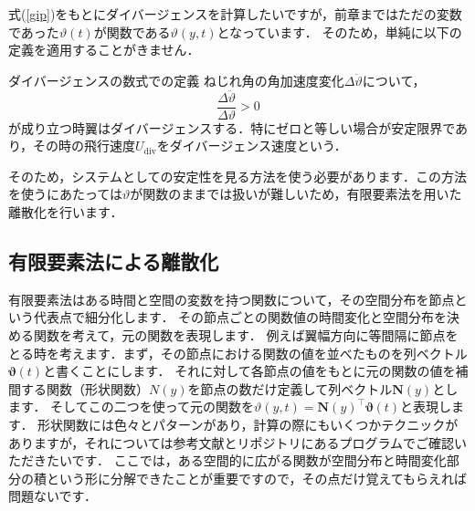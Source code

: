 \documentclass{jarticle}
\begin{document}
式(\ref{gip})をもとにダイバージェンスを計算したいですが，前章まではただの変数であった$\vartheta(t)$が関数である$\vartheta(y,t)$となっています．
そのため，単純に以下の定義を適用することがきません．
\begin{itembox}[l]{ダイバージェンスの数式での定義}
    ねじれ角の角加速度変化$\Delta \ddot{\vartheta}$について，
    \begin{equation*}
        \frac{\Delta \ddot{\vartheta}}{\Delta \vartheta} > 0
    \end{equation*}
    が成り立つ時翼はダイバージェンスする．特にゼロと等しい場合が安定限界であり，その時の飛行速度$U_\mathrm{div}$をダイバージェンス速度という．
\end{itembox}
そのため，システムとしての安定性を見る方法を使う必要があります．この方法を使うにあたっては$\vartheta$が関数のままでは扱いが難しいため，有限要素法を用いた離散化を行います．

\subsection{有限要素法による離散化}

有限要素法はある時間と空間の変数を持つ関数について，その空間分布を節点という代表点で細分化します．
その節点ごとの関数値の時間変化と空間分布を決める関数を考えて，元の関数を表現します．
例えば翼幅方向に等間隔に節点をとる時を考えます．まず，その節点における関数の値を並べたものを列ベクトル$\bm{\vartheta}(t)$と書くことにします．
それに対して各節点の値をもとに元の関数の値を補間する関数（形状関数）$N(y)$を節点の数だけ定義して列ベクトル$\bm{N}(y)$とします．
そしてこの二つを使って元の関数を$\vartheta(y,t) = \bm{N}(y)^\top\bm{\vartheta}(t)$と表現します．
形状関数には色々とパターンがあり，計算の際にもいくつかテクニックがありますが，それについては参考文献とリポジトリにあるプログラムでご確認いただきたいです．
ここでは，ある空間的に広がる関数が空間分布と時間変化部分の積という形に分解できたことが重要ですので，その点だけ覚えてもらえれば問題ないです．
\end{document}
